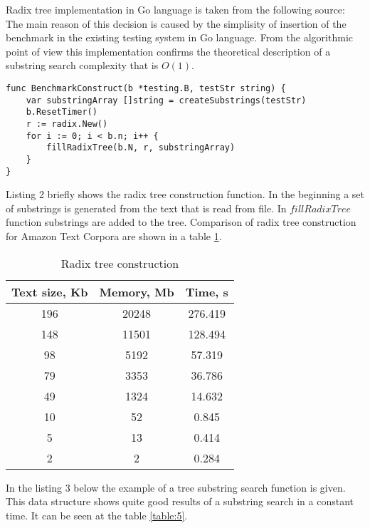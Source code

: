 Radix tree implementation in Go language is taken from the following source: \cite{golang2016sa}
The main reason of this decision is caused by the simplisity of insertion of the benchmark
in the existing testing system in Go language.
From the algorithmic point of view this implementation confirms the theoretical description of
a substring search complexity that is $O(1)$.

\newpage
\begin{lstlisting}[caption=Radix tree example]
func BenchmarkConstruct(b *testing.B, testStr string) {
	var substringArray []string = createSubstrings(testStr)
	b.ResetTimer()
	r := radix.New()
	for i := 0; i < b.n; i++ {
		fillRadixTree(b.N, r, substringArray)
	}
}
\end{lstlisting}

Listing 2 briefly shows the radix tree construction function.
In the beginning a set of substrings is generated from the text that is read from file.
In $fillRadixTree$ function substrings are added to the tree. Comparison of
radix tree construction for Amazon Text Corpora \cite{amazon2013text} are shown in a table \ref{table:4}.


\begin{table}[h!]
    \centering
    \begin{tabular}{|c|c|c|}
        \hline
        Text size, Kb & Memory, Mb & Time, s\\
        \hline
        196 & 20248 & 276.419\\
        \hline
        148 & 11501 & 128.494\\
        \hline
        98 & 5192 & 57.319\\
        \hline
        79 & 3353 & 36.786\\
        \hline
        49 & 1324 & 14.632\\
        \hline
        10 & 52 & 0.845\\
        \hline
        5 & 13 & 0.414\\
        \hline
        2 & 2 & 0.284\\
        \hline
    \end{tabular}
    \caption{Radix tree construction}
    \label{table:4}
\end{table}

In the listing 3 below the example of a tree substring search function is given.
This data structure shows quite good results of a substring search in a constant time.
It can be seen at the table \ref{table:5}.

